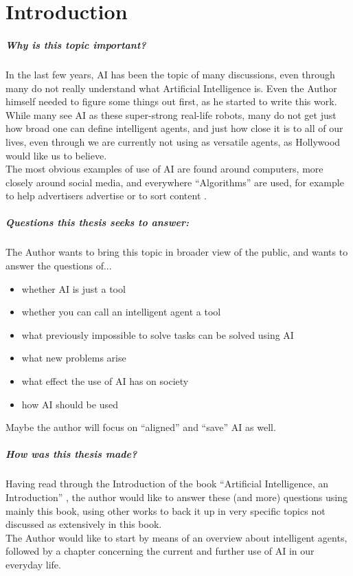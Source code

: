\chapter{Introduction}
\paragraph{Why is this topic important?}
In the last few years, AI has been the topic of many discussions, even through many do not really understand what Artificial Intelligence is.
Even the Author himself needed to figure some things out first, as he started to write this work.\\While many see AI as these super-strong real-life robots, many do not get just how broad one can define intelligent agents, and just how close it is to all of our lives, even through we are currently not using as versatile agents, as Hollywood would like us to believe.\\The most obvious examples of use of AI are found around computers, more closely around social media, and everywhere “Algorithms” are used, for example to help advertisers advertise \cite{facebookWerbungAufInstagram} or to sort content \cite{googleFunktioniertGoogleSucheSuchalgorithmen}.
\paragraph{Questions this thesis seeks to answer:}
The Author wants to bring this topic in broader view of the public, and wants to answer the questions of... 
\begin{itemize}
    \item whether AI is just a tool
    \item whether you can call an intelligent agent a tool
    \item what previously impossible to solve tasks can be solved using AI
    \item what new problems arise
    \item what effect the use of AI has on society
    \item how AI should be used
\end{itemize}
Maybe the author will focus on “aligned” and “save” AI as well.
\paragraph{How was this thesis made?}
Having read through the Introduction of the book “Artificial Intelligence, an Introduction” \cite{russellArtificialIntelligenceModern2010}, the author would like to answer these (and more) questions using mainly this book, using other works to back it up in very specific topics not discussed as extensively in this book.\\The Author would like to start by means of an overview about intelligent agents, followed by a chapter concerning the current and further use of AI in our everyday life.